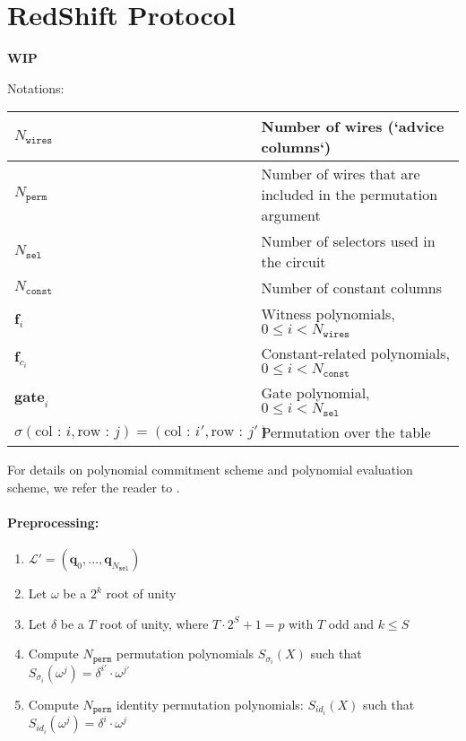 \section{RedShift Protocol}
\label{section:protocol}
\textbf{WIP}

Notations:

\begin{center}
\begin{table}[H]
\begin{tabular}{| l | l |}
 	\hline
	$N_{\texttt{wires}}$ & Number of wires (`advice columns`) \\
	\hline
	$N_{\texttt{perm}}$ & Number of wires that are included in the permutation argument \\
	\hline
	$N_{\texttt{sel}}$ & Number of selectors used in the circuit \\
	\hline
	$N_{\texttt{const}}$ & Number of constant columns  \\
	\hline
	$\textbf{f}_i$ & Witness polynomials, $0 \leq i < N_{\texttt{wires}}$  \\
	\hline
	$\textbf{f}_{c_i}$ & Constant-related polynomials, $0 \leq i < N_{\texttt{const}}$  \\
	\hline
	$\textbf{gate}_i$ & Gate polynomial, $0 \leq i < N_{\texttt{sel}}$  \\
	\hline
	$\sigma(\text{col : } i, \text{row : } j) = (\text{col : } i', \text{row : } j')$ & Permutation over the table \\
	\hline
\end{tabular}
\end{table}
\end{center}

For details on polynomial commitment scheme and polynomial evaluation scheme, we refer the reader to \cite{cryptoeprint:2019:1400}.

\paragraph{Preprocessing:}


\begin{algorithm}[h]
\begin{enumerate}
	\item $\mathcal{L}' = (\textbf{q}_{0}, ..., \textbf{q}_{N_{\texttt{sel}}})$
	\item Let $\omega$ be a $2^k$ root of unity
	\item Let $\delta$ be a $T$ root of unity, where $T \cdot 2^S + 1 = p$ with $T$ odd and $k \leq S$
	\item Compute $N_{\texttt{perm}}$ permutation polynomials $S_{\sigma_i}(X)$ such that $S_{\sigma_i}(\omega^j) = \delta^{i'} \cdot \omega^{j'}$
	\item Compute $N_{\texttt{perm}}$ identity permutation polynomials: $S_{id_i}(X)$ such that $S_{id_i}(\omega^j) = \delta^i \cdot \omega^j$
\end{enumerate}
\end{algorithm}

